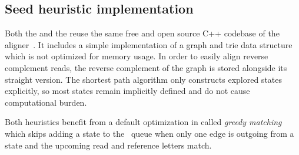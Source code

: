 \subsection{Seed heuristic implementation}

Both the \seedh and the \prefixh reuse the same free and open source C++
codebase of the \astarix aligner~\citep{ivanov2020astarix}. It includes a simple
implementation of a graph and trie data structure which is not optimized for
memory usage. In order to easily align reverse complement reads, the reverse
complement of the graph is stored alongside its straight version. The shortest
path algorithm only constructs explored states explicitly, so most states remain
implicitly defined and do not cause computational burden.

Both heuristics benefit from a default optimization in \astarix called
\textit{greedy matching}~\citep[Section 4.2]{ivanov2020astarix} which skips
adding a state to the \A~queue when only one edge is outgoing from a state and
the upcoming read and reference letters match.